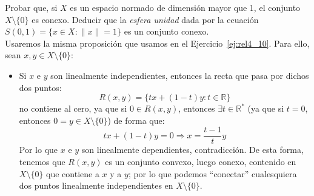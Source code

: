 \begin{ejercicio}
Probar que, si \( X \) es un espacio normado de dimensión mayor que 1, el conjunto \( X \setminus \{0\} \) es conexo. Deducir que la \textit{esfera unidad} dada por la ecuación \( S(0,1) = \{ x \in X : \|x\| = 1 \} \) es un conjunto conexo.\\

\noindent
Usaremos la misma proposición que usamos en el Ejercicio~\ref{ej:rel4_10}. Para ello, sean $x,y\in X\setminus \{0\}$:
\begin{itemize}
    \item Si $x$ e $y$ son linealmente independientes, entonces la recta que pasa por dichos dos puntos:
        \begin{equation*}
            R(x,y) = \{tx + (1-t)y : t\in \mathbb{R}\}
        \end{equation*}
        no contiene al cero, ya que si $0\in R(x,y)$, entonces $\exists t\in \mathbb{R}^\ast$ (ya que si $t=0$, entonces $0=y\in X\setminus \{0\}$) de forma que:
        \begin{equation*}
            tx + (1-t)y = 0 \Longrightarrow x = \dfrac{t-1}{t}y
        \end{equation*}
        Por lo que $x$ e $y$ son linealmente dependientes, contradicción. De esta forma, tenemos que $R(x,y)$ es un conjunto convexo, luego conexo, contenido en $X\setminus \{0\}$ que contiene a $x$ y a $y$; por lo que podemos ``conectar'' cualesquiera dos puntos linealmente independientes en $X\setminus \{0\}$.
        \begin{figure}[H]
            \centering
\end{figure}
\end{itemize}
\end{ejercicio}
